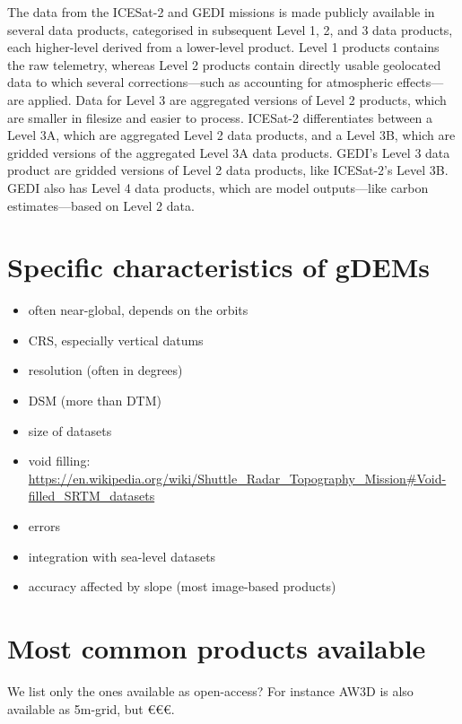 %

The data from the ICESat-2 and GEDI missions is made publicly available in several data products, categorised in subsequent Level 1, 2, and 3 data products, each higher-level derived from a lower-level product.
Level 1 products contains the raw telemetry, whereas Level 2 products contain directly usable geolocated data to which several corrections---such as accounting for atmospheric effects---are applied.
Data for Level 3 are aggregated versions of Level 2 products, which are smaller in filesize and easier to process.
ICESat-2 differentiates between a Level 3A, which are aggregated Level 2 data products, and a Level 3B, which are gridded versions of the aggregated Level 3A data products.
GEDI's Level 3 data product are gridded versions of Level 2 data products, like ICESat-2's Level 3B.
GEDI also has Level 4 data products, which are model outputs---like carbon estimates---based on Level 2 data.


%
\section[Specific characteristics]{Specific characteristics of gDEMs}

\begin{itemize}
  \item often near-global, depends on the orbits
  \item CRS, especially vertical datums
  \item resolution (often in degrees)
  \item DSM (more than DTM)
  \item size of datasets
  \item void filling: \url{https://en.wikipedia.org/wiki/Shuttle_Radar_Topography_Mission#Void-filled_SRTM_datasets}
  \item errors
  \item integration with sea-level datasets
  \item accuracy affected by slope (most image-based products)
\end{itemize}


%
\section[Most common products]{Most common products available}

We list only the ones available as open-access?
For instance AW3D is also available as 5m-grid, but €€€.

